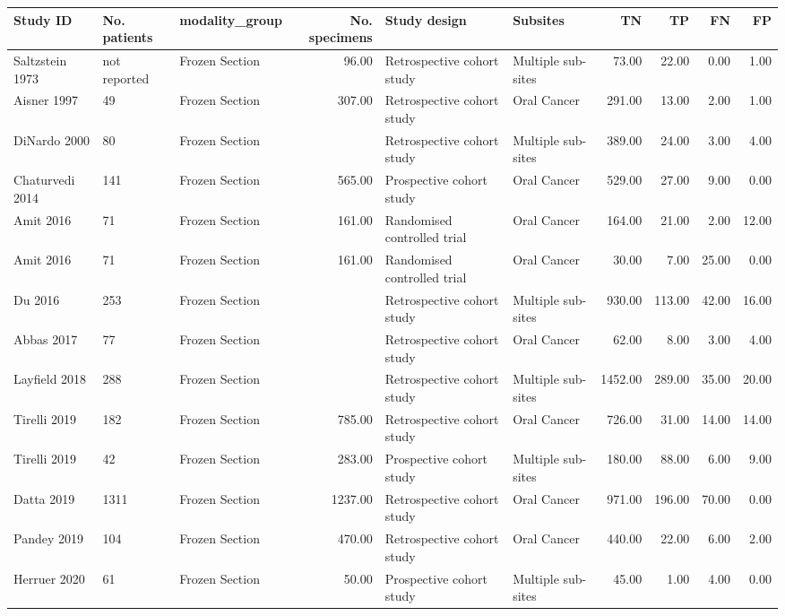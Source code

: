\begin{table}[ht]
\centering
\begingroup\tiny
\begin{tabular}{lllrllrrrr}
  \hline
Study ID & No. patients & modality\_group & No. specimens & Study design & Subsites & TN & TP & FN & FP \\ 
  \hline
Saltzstein 1973 & not reported & Frozen Section & 96.00 & Retrospective cohort study & Multiple sub-sites & 73.00 & 22.00 & 0.00 & 1.00 \\ 
  Aisner 1997 & 49 & Frozen Section & 307.00 & Retrospective cohort study & Oral Cancer & 291.00 & 13.00 & 2.00 & 1.00 \\ 
  DiNardo 2000 & 80 & Frozen Section &  & Retrospective cohort study & Multiple sub-sites & 389.00 & 24.00 & 3.00 & 4.00 \\ 
  Chaturvedi 2014 & 141 & Frozen Section & 565.00 & Prospective cohort study & Oral Cancer & 529.00 & 27.00 & 9.00 & 0.00 \\ 
  Amit 2016 & 71 & Frozen Section & 161.00 & Randomised controlled trial & Oral Cancer & 164.00 & 21.00 & 2.00 & 12.00 \\ 
  Amit 2016 & 71 & Frozen Section & 161.00 & Randomised controlled trial & Oral Cancer & 30.00 & 7.00 & 25.00 & 0.00 \\ 
  Du 2016 & 253 & Frozen Section &  & Retrospective cohort study & Multiple sub-sites & 930.00 & 113.00 & 42.00 & 16.00 \\ 
  Abbas 2017 & 77 & Frozen Section &  & Retrospective cohort study & Oral Cancer & 62.00 & 8.00 & 3.00 & 4.00 \\ 
  Layfield 2018 & 288 & Frozen Section &  & Retrospective cohort study & Multiple sub-sites & 1452.00 & 289.00 & 35.00 & 20.00 \\ 
  Tirelli 2019 & 182 & Frozen Section & 785.00 & Retrospective cohort study & Oral Cancer & 726.00 & 31.00 & 14.00 & 14.00 \\ 
  Tirelli 2019 & 42 & Frozen Section & 283.00 & Prospective cohort study & Multiple sub-sites & 180.00 & 88.00 & 6.00 & 9.00 \\ 
  Datta 2019 & 1311 & Frozen Section & 1237.00 & Retrospective cohort study & Oral Cancer & 971.00 & 196.00 & 70.00 & 0.00 \\ 
  Pandey 2019 & 104 & Frozen Section & 470.00 & Retrospective cohort study & Oral Cancer & 440.00 & 22.00 & 6.00 & 2.00 \\ 
  Herruer 2020 & 61 & Frozen Section & 50.00 & Prospective cohort study & Multiple sub-sites & 45.00 & 1.00 & 4.00 & 0.00 \\ 

\end{tabular}
\end{table}
